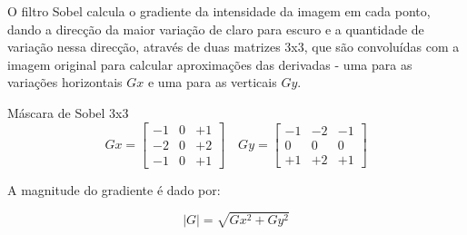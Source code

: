 \documentclass[12pt]{article}
\begin{document}
O filtro Sobel calcula o gradiente da intensidade da imagem em cada ponto, dando a direcção da maior variação de claro para escuro e a quantidade de variação nessa direcção, através de duas matrizes 3x3, que são convoluídas com a imagem original para calcular aproximações das derivadas - uma para as variações horizontais $Gx$ e uma para as verticais $Gy$.
\begin{center}{Máscara de Sobel 3x3}
$$
Gx=\left[\begin{array}{rrr}
-1&0&+1\\
-2&0&+2 \\
-1&0&+1
\end{array}\right]\quad
Gy=\left[\begin{array}{ccc}
-1&-2&-1\\
0& 0& 0 \\
+1&+2&+1
\end{array}\right]
$$
\end{center}
A magnitude do gradiente é dado por:

$$
|G|=\sqrt{Gx^2 + Gy^2}
$$	
\end{document}
